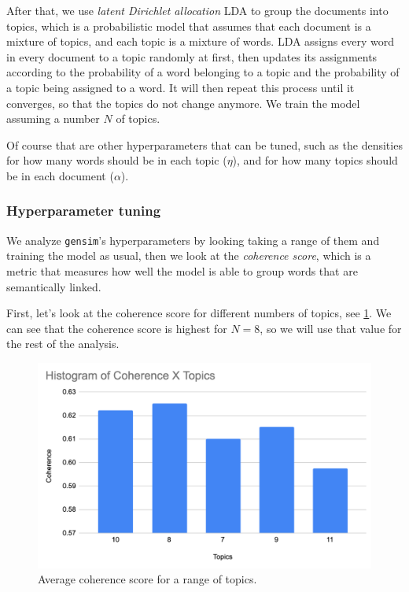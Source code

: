 \documentclass[conference, onecolumn]{IEEEtran}
\begin{document}
After that, we use \textit{latent Dirichlet allocation} LDA to group the
documents into topics, which is a probabilistic model that assumes that each
document is a mixture of topics, and each topic is a mixture of words.
LDA assigns every word in every document to a topic randomly at first, then
updates its assignments according to the probability of a word belonging to a
topic and the probability of a topic being assigned to a word.
It will then repeat this process until it converges, so that the topics do not
change anymore.
We train the model assuming a number $N$ of topics.

Of course that are other hyperparameters that can be tuned, such as the
densities for how many words should be in each topic ($\eta$), and for how many
topics should be in each document ($\alpha$).

\subsubsection{Hyperparameter tuning} \label{sec:methodology:statistics-hyper}

We analyze \verb|gensim|'s hyperparameters by looking taking a range of them
and training the model as usual, then we look at the \textit{coherence score},
which is a metric that measures how well the model is able to group words that
are semantically linked.

First, let's look at the coherence score for different numbers of topics, see
\cref{fig:coherenceXtopics}.
We can see that the coherence score is highest for $N = 8$, so we will use that
value for the rest of the analysis.

\begin{figure}[H]
    \centering
    \includegraphics[width=0.7\linewidth]{coherenceXtopics.png}
    \caption{Average coherence score for a range of topics.}
    \label{fig:coherenceXtopics}
\end{figure}
\end{document}
